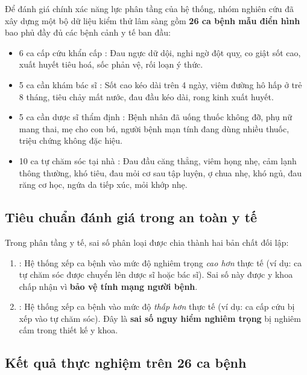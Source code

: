 Để đánh giá chính xác năng lực phân tầng của hệ thống, nhóm nghiên cứu đã xây
dựng một bộ dữ liệu kiểm thử lâm sàng gồm \textbf{26 ca bệnh mẫu điển hình}
bao phủ đầy đủ các bệnh cảnh y tế ban đầu:
\begin{itemize}[leftmargin=1.6em, itemsep=2pt]
  \item 6 ca cấp cứu khẩn cấp : Đau ngực dữ dội, nghi ngờ đột
        quỵ, co giật sốt cao, xuất huyết tiêu hoá, sốc phản vệ, rối loạn ý thức.
  \item 5 ca cần khám bác sĩ : Sốt cao kéo dài trên 4 ngày,
        viêm đường hô hấp ở trẻ 8 tháng, tiêu chảy mất nước, đau đầu kéo dài,
        rong kinh xuất huyết.
  \item 5 ca cần dược sĩ thẩm định : Bệnh nhân đã uống
        thuốc không đỡ, phụ nữ mang thai, mẹ cho con bú, người bệnh mạn tính
        đang dùng nhiều thuốc, triệu chứng không đặc hiệu.
  \item 10 ca tự chăm sóc tại nhà : Đau đầu căng thẳng, viêm họng
        nhẹ, cảm lạnh thông thường, khó tiêu, đau mỏi cơ sau tập luyện, ợ chua
        nhẹ, khó ngủ, đau răng cơ học, ngứa da tiếp xúc, mỏi khớp nhẹ.
\end{itemize}

\subsection{Tiêu chuẩn đánh giá trong an toàn y tế}

Trong phân tầng y tế, sai số phân loại được chia thành hai bản chất đối lập:
\begin{enumerate}[leftmargin=1.6em, itemsep=2pt]
  \item {}: Hệ thống xếp ca bệnh vào mức độ
        nghiêm trọng \emph{cao hơn} thực tế (ví dụ: ca tự chăm sóc được chuyển
        lên dược sĩ hoặc bác sĩ). Sai số này được y khoa chấp nhận vì \textbf{bảo
        vệ tính mạng người bệnh}.
  \item {}: Hệ thống xếp ca bệnh vào mức
        độ \emph{thấp hơn} thực tế (ví dụ: ca cấp cứu bị xếp vào tự chăm sóc).
        Đây là \textbf{sai số nguy hiểm nghiêm trọng} bị nghiêm cấm trong thiết kế y khoa.
\end{enumerate}

\subsection{Kết quả thực nghiệm trên 26 ca bệnh}

